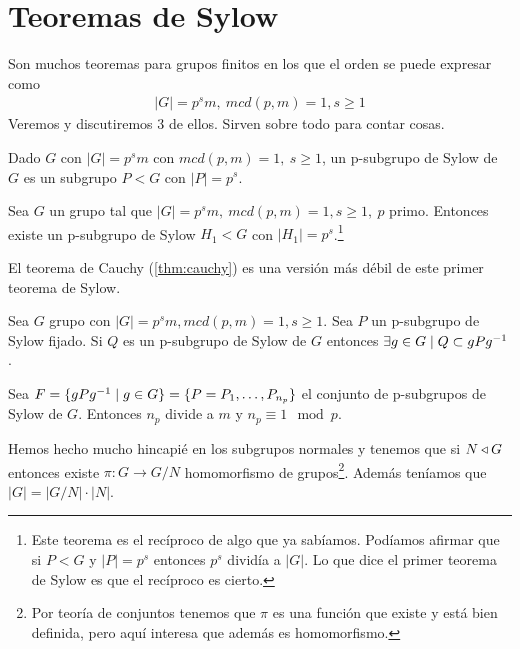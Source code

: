 
\chapter{Teoremas de Sylow}


Son muchos teoremas para grupos finitos en los que el orden se puede expresar como
\begin{align}
	|G| = p^s m,\ mcd(p, m) = 1, s \geq 1
\end{align}
Veremos y discutiremos 3 de ellos. Sirven sobre todo para contar cosas.

\begin{dfn}
	Dado $G$ con $|G| = p^sm$ con $mcd(p,m) = 1,\ s \geq 1$, un p-subgrupo de Sylow de $G$ es un subgrupo $P < G$ con $|P| = p^s$.
\end{dfn}

\begin{thm}
	\label{thm:sylow1}
	Sea $G$ un grupo tal que $|G| = p^s m,\ mcd(p, m) = 1, s \geq 1,\ p$ primo. Entonces existe un p-subgrupo de Sylow $H_1 < G$ con $|H_1| = p^s$.\footnote{Este teorema es el recíproco de algo que ya sabíamos. Podíamos afirmar que si $P < G$ y $|P| = p^s$ entonces $p^s$ dividía a $|G|$. Lo que dice el primer teorema de Sylow es que el recíproco es cierto.}
\end{thm}

El teorema de Cauchy (\ref{thm:cauchy}) es una versión más débil de este primer teorema de Sylow.

\begin{thm}
	\label{thm:sylow2}
	Sea $G$ grupo con $|G| = p^s m, mcd(p, m) = 1, s \geq 1$. Sea $P$ un p-subgrupo de Sylow fijado. Si $Q$ es un p-subgrupo de Sylow de $G$ entonces $\exists g \in G \mid Q \subset gPg^{-1}$.
\end{thm}

\begin{thm}
	\label{thm:sylow3}
	Sea $F = \{g P g^{-1} \mid g \in G \} = \{P = P_{1}, \dots, P_{n_p}\}$ el conjunto de p-subgrupos de Sylow de $G$. Entonces $n_p$ divide a $m$ y $n_p \equiv 1 \mod p$.
\end{thm}

Hemos hecho mucho hincapié en los subgrupos normales y tenemos que si $N \mathbin{\triangleleft} G$ entonces existe $\pi:G \to G/N$ homomorfismo de grupos\footnote{Por teoría de conjuntos tenemos que $\pi$ es una función que existe y está bien definida, pero aquí interesa que además es homomorfismo.}. Además teníamos que $|G| = |G/N| \cdot |N|$.

